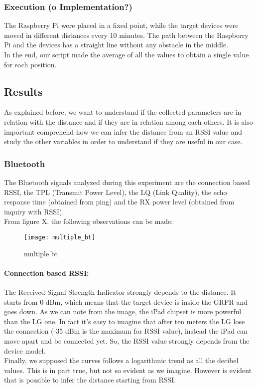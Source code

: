 \subsubsection{Execution (o Implementation?)}
The Raspberry Pi were placed in a fixed point, while the target devices were moved in different distances every 10 minutes. The path between the Raspberry Pi and the devices has a straight line without any obstacle in the middle.\\
In the end, our script made the average of all the values to obtain a single value for each position.
\subsection{Results}
As explained before, we want to understand if the collected parameters are in relation with the distance and if they are in relation among each others. It is also important comprehend how we can infer the distance from an RSSI value and study the other variables in order to understand if they are useful in our case.
\subsubsection{Bluetooth}
The Bluetooth signals analyzed during this experiment are the connection based RSSI, the TPL (Transmit Power Level), the LQ (Link Quality), the echo response time (obtained from ping) and the RX power level (obtained from inquiry with RSSI).\\
From figure X, the following observations can be made:
\begin{figure}[htbp]
\centering
\texttt{[image: multiple\_bt]}
\caption{multiple bt}
\end{figure}
\paragraph{Connection based RSSI:} The Received Signal Strength Indicator strongly depends to the distance. It starts from 0 dBm, which means that the target device is inside the GRPR and goes down. As we can note from the image, the iPad chipset is more powerful than the LG one. In fact it's easy to imagine that after ten meters the LG lose the connection (-35 dBm is the maximum for RSSI value), instead the iPad can move apart and be connected yet. So, the RSSI value strongly depends from the device model.\\
Finally, we supposed the curves follows a logarithmic trend as all the decibel values. This is in part true, but not so evident as we imagine. However is evident that is possible to infer the distance starting from RSSI.
